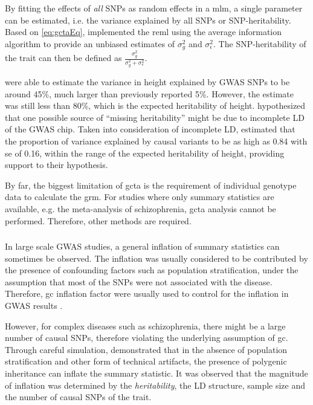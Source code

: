 \documentclass[12pt]{scrbook}
\newcommand*{\glng}{\glsentrylong}
\newcommand*{\scz}{schizophrenia}
\begin{document}
By fitting the effects of \emph{all} \glspl{SNP} as random effects in a \gls{mlm}, a single parameter can be estimated, i.e. the variance explained by all \glspl{SNP} or \gls{SNP}-heritability.
Based on \cref{eq:gctaEq}, \citet{Yang2011} implemented the \gls{reml} using the average information algorithm to provide an unbiased estimates of $\sigma_g^2$ and $\sigma_\epsilon^2$.
The \gls{SNP}-heritability of the trait can then be defined as $\frac{\sigma_g^2}{\sigma_g^2+\sigma_e^2}$.
	
\citet{Yang2010a} were able to estimate the variance in height explained by \gls{GWAS} \glspl{SNP}  to be around 45\%, much larger than previously reported 5\%.
However, the estimate was still less than 80\%, which is the expected heritability of height.
\citet{Yang2010a} hypothesized that one possible source of ``missing heritability'' might be due to incomplete \gls{LD} of the \gls{GWAS} chip.
Taken into consideration of incomplete \gls{LD}, \citet{Yang2010a} estimated that the proportion of variance explained by causal variants to be as high as 0.84 with \gls{se} of 0.16, within the range of the expected heritability of height, providing support to their hypothesis.

By far, the biggest limitation of \gls{gcta} is the requirement of individual genotype data to calculate the \gls{grm}.
For studies where only summary statistics are available, e.g. the meta-analysis of \scz, \gls{gcta} analysis cannot be performed.
Therefore, other methods are required. 
	
\subsubsection{\glng{ldsc}}
In large scale \gls{GWAS} studies, a general inflation of summary statistics can sometimes be observed.
The inflation was usually considered to be contributed by the presence of confounding factors such as population stratification, under the assumption that most of the \glspl{SNP} were not associated with the disease.
Therefore, \gls{gc} inflation factor were usually used to control for the inflation in \gls{GWAS} results \citep{Zheng2006}.
	
However, for complex diseases such as \scz, there might be a large number of causal \glspl{SNP}, therefore violating the underlying assumption of \gls{gc}. 
Through careful simulation, \citet{Yang2011b} demonstrated that in the absence of population stratification and other form of technical artifacts, the presence of polygenic inheritance can inflate the summary statistic.
It was observed that the magnitude of inflation was determined by the \emph{heritability}, the \gls{LD} structure, sample size and the number of causal \glspl{SNP} of the trait.
\end{document}
